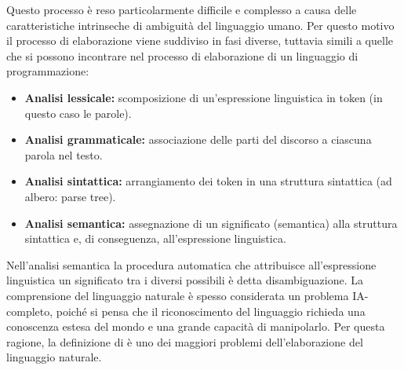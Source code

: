 \documentclass{article}
\theoremstyle{plain}
\theoremstyle{definition}
\begin{document}
Questo processo è reso particolarmente difficile e complesso a causa delle caratteristiche intrinseche di ambiguità del linguaggio umano. Per questo motivo il processo di elaborazione viene suddiviso in fasi diverse, tuttavia simili a quelle che si possono incontrare nel processo di elaborazione di un linguaggio di programmazione:


\begin{itemize}
\item \textbf{Analisi lessicale:} scomposizione di un'espressione linguistica in token (in questo caso le parole).
\item \textbf{Analisi grammaticale:} associazione delle parti del discorso a ciascuna parola nel testo.
\item \textbf{Analisi sintattica:} arrangiamento dei token in una struttura sintattica (ad albero: parse tree).
\item  \textbf{Analisi semantica:} assegnazione di un significato (semantica) alla struttura sintattica e, di conseguenza, all'espressione linguistica.
\end{itemize}


Nell'analisi semantica la procedura automatica che attribuisce all'espressione linguistica un significato tra i diversi possibili è detta disambiguazione.
La comprensione del linguaggio naturale è spesso considerata un problema IA-completo, poiché si pensa che il riconoscimento del linguaggio richieda una conoscenza estesa del mondo e una grande capacità di manipolarlo. Per questa ragione, la definizione di  è uno dei maggiori problemi dell'elaborazione del linguaggio naturale.\footnotemark
{}
\end{document}
